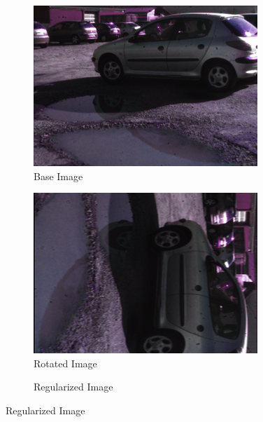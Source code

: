 \begin{figure}[h]
	\vspace{0.3cm}
	\centering
	\begin{subfigure}[b]{0.32\linewidth}
		\centering
		\caption*{Base Image}
		
		\includegraphics[width=\linewidth]{Figures/Aug/hsl.png}
	\end{subfigure}
	\begin{subfigure}[b]{0.32\linewidth}  
		\centering 
		\caption*{Rotated Image}
		
		\includegraphics[width=\linewidth]{Figures/Aug/hsl_trans_rot.png}
	\end{subfigure}
	\begin{subfigure}[b]{0.32\linewidth}
		\centering
		\caption*{Regularized Image}
		

\end{subfigure}
\end{figure}
